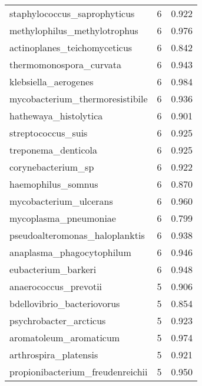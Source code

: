 \begin{tabular}{lrr}
                staphylococcus\_saprophyticus &                   6 &     0.922 \\
                methylophilus\_methylotrophus &                   6 &     0.976 \\
                actinoplanes\_teichomyceticus &                   6 &     0.842 \\
                     thermomonospora\_curvata &                   6 &     0.943 \\
                        klebsiella\_aerogenes &                   6 &     0.984 \\
             mycobacterium\_thermoresistibile &                   6 &     0.936 \\
                       hathewaya\_histolytica &                   6 &     0.901 \\
                          streptococcus\_suis &                   6 &     0.925 \\
                         treponema\_denticola &                   6 &     0.925 \\
                          corynebacterium\_sp &                   6 &     0.922 \\
                          haemophilus\_somnus &                   6 &     0.870 \\
                      mycobacterium\_ulcerans &                   6 &     0.960 \\
                       mycoplasma\_pneumoniae &                   6 &     0.799 \\
              pseudoalteromonas\_haloplanktis &                   6 &     0.938 \\
                   anaplasma\_phagocytophilum &                   6 &     0.946 \\
                         eubacterium\_barkeri &                   6 &     0.948 \\
                       anaerococcus\_prevotii &                   5 &     0.906 \\
                  bdellovibrio\_bacteriovorus &                   5 &     0.854 \\
                      psychrobacter\_arcticus &                   5 &     0.923 \\
                      aromatoleum\_aromaticum &                   5 &     0.974 \\
                       arthrospira\_platensis &                   5 &     0.921 \\
            propionibacterium\_freudenreichii &                   5 &     0.950 \\

\end{tabular}
